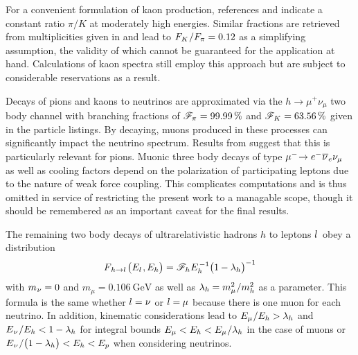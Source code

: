 For a convenient formulation of kaon production, references \cite{Lykasov_2021} and \cite{Lykasov_2022} indicate a constant ratio
$\pi / K$ at moderately high energies. Similar fractions are retrieved from multiplicities given in \cite{Koers_2006} and lead to
$F_K \kern+0.5pt / F_\pi = \num{0.12}$ as a simplifying assumption, the validity of which cannot be guaranteed for the application
at hand. Calculations of kaon spectra still employ this approach but are subject to considerable reservations as a result.

Decays of pions and kaons to neutrinos are approximated via the $h \rightarrow \mu^+ \nu_\mu$ two body channel with branching
fractions of $\mathscr{F}_{\kern-0.2pt \pi \kern+0.2pt} = \qty{99.99}{\percent}$ and
$\mathscr{F}_{\kern+0.3pt K \kern+0.2pt} = \qty{63.56}{\percent}$ given in the \cite{pdg}
particle listings. By decaying, muons produced in these processes can significantly impact the neutrino spectrum. Results from
\cite{Carpio_2020} suggest that this is particularly relevant for pions. Muonic three body decays of type
$\mu^- \kern-2.5pt \kern+0.5pt \rightarrow e^- \kern+0.5pt \overline{\kern-0.2pt \nu \kern+0.8pt}_e \nu_\mu$ as well as
cooling factors depend on the polarization of participating leptons due to the nature of weak force coupling. This complicates
computations and is thus omitted in service of restricting the present work to a managable scope, though it should be remembered
as an important caveat for the final results.

The remaining two body decays of ultrarelativistic hadrons $h$ to leptons $l \kern+1.0pt$ obey a distribution
\begin{equation*}
	F_{\kern+1.0pt h \kern+0.2pt \rightarrow l \kern+1.0pt} \bigl( E_l \kern+0.8pt, \kern-0.2pt E_h \bigr) =
	\mathscr{F}_{\kern+0.2pt h \kern+0.2pt} E_h^{\kern+1.0pt -1} \bigl( 1 \kern-0.3pt - \lambda_h \bigr)^{-1}
\end{equation*}
with $m_{\kern+0.5pt \nu} = 0$ and $m_\mu = \qty{0.106}{\giga\electronvolt}$ \cite{pdg} as well as
$\lambda_h \kern-0.3pt = m_\mu^2 \kern+0.5pt / m_h^2$ as a parameter. This formula is the same whether $l = \nu \kern+0.2pt$ or
$l = \kern-0.3pt \mu$ because there is one muon for each neutrino. In addition, kinematic considerations lead to
$E_\mu \kern+0.5pt / E_h > \lambda_h$ and $E_{\kern+0.5pt \nu} \kern+0.5pt / E_h < 1 - \lambda_h$ for integral bounds
$E_\mu < E_h < E_\mu \kern+0.5pt / \lambda_h$ in the case of muons or
$E_{\kern+0.5pt \nu} \kern+0.5pt / \smash{\bigl( 1 - \lambda_h \bigr)} < E_h < E_p$ when considering neutrinos.



